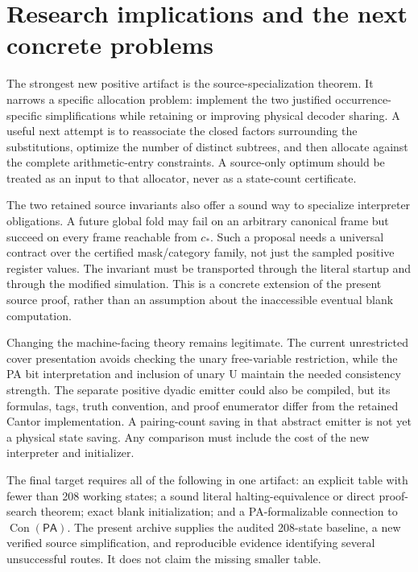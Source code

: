 \documentclass[11pt,a4paper]{article}
\theoremstyle{definition}
\newcommand{\PA}{\mathsf{PA}}
\newcommand{\Con}{\operatorname{Con}}
\begin{document}
\section{Research implications and the next concrete problems}

The strongest new positive artifact is the source-specialization theorem. It narrows a specific allocation problem: implement the two justified occurrence-specific simplifications while retaining or improving physical decoder sharing. A useful next attempt is to reassociate the closed factors surrounding the substitutions, optimize the number of distinct subtrees, and then allocate against the complete arithmetic-entry constraints. A source-only optimum should be treated as an input to that allocator, never as a state-count certificate.

The two retained source invariants also offer a sound way to specialize interpreter obligations. A future global fold may fail on an arbitrary canonical frame but succeed on every frame reachable from $c_*$. Such a proposal needs a universal contract over the certified mask/category family, not just the sampled positive register values. The invariant must be transported through the literal startup and through the modified simulation. This is a concrete extension of the present source proof, rather than an assumption about the inaccessible eventual blank computation.

Changing the machine-facing theory remains legitimate. The current unrestricted cover presentation avoids checking the unary free-variable restriction, while the PA bit interpretation and inclusion of unary U maintain the needed consistency strength. The separate positive dyadic emitter could also be compiled, but its formulas, tags, truth convention, and proof enumerator differ from the retained Cantor implementation. A pairing-count saving in that abstract emitter is not yet a physical state saving. Any comparison must include the cost of the new interpreter and initializer.

The final target requires all of the following in one artifact: an explicit table with fewer than 208 working states; a sound literal halting-equivalence or direct proof-search theorem; exact blank initialization; and a PA-formalizable connection to $\Con(\PA)$. The present archive supplies the audited 208-state baseline, a new verified source simplification, and reproducible evidence identifying several unsuccessful routes. It does not claim the missing smaller table.
\end{document}
